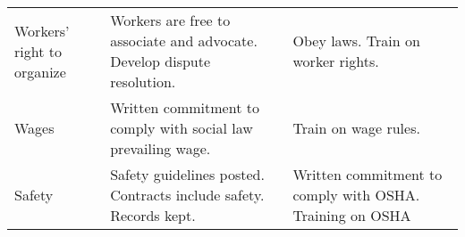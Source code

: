 \begin{table}
\begin{longtable*}[]{@{}lll@{}}
\begin{minipage}[t]{0.20\columnwidth}\raggedright\strut
Workers' right to organize\strut
\end{minipage} & \begin{minipage}[t]{0.36\columnwidth}\raggedright\strut
Workers are free to associate and advocate. Develop dispute
resolution.\strut
\end{minipage} & \begin{minipage}[t]{0.36\columnwidth}\raggedright\strut
Obey laws. Train on worker rights.\strut
\end{minipage}\tabularnewline
\begin{minipage}[t]{0.20\columnwidth}\raggedright\strut
Wages\strut
\end{minipage} & \begin{minipage}[t]{0.36\columnwidth}\raggedright\strut
Written commitment to comply with social law prevailing wage.\strut
\end{minipage} & \begin{minipage}[t]{0.36\columnwidth}\raggedright\strut
Train on wage rules.\strut
\end{minipage}\tabularnewline
\begin{minipage}[t]{0.20\columnwidth}\raggedright\strut
Safety\strut
\end{minipage} & \begin{minipage}[t]{0.36\columnwidth}\raggedright\strut
Safety guidelines posted. Contracts include safety. Records kept.\strut
\end{minipage} & \begin{minipage}[t]{0.36\columnwidth}\raggedright\strut
Written commitment to comply with OSHA. Training on OSHA\strut
\end{minipage}\tabularnewline
\bottomrule
\end{longtable*}

\end{table}
